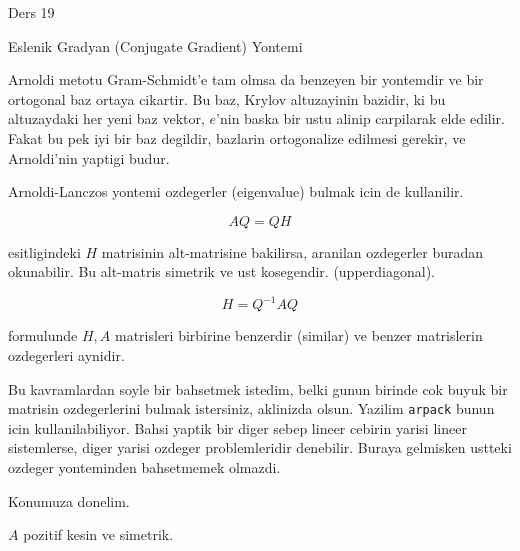 \documentclass[12pt,fleqn]{article}\usepackage{../common}
\begin{document}
Ders 19

Eslenik Gradyan (Conjugate Gradient) Yontemi 

Arnoldi metotu Gram-Schmidt'e tam olmsa da benzeyen bir yontemdir ve bir
ortogonal baz ortaya cikartir. Bu baz, Krylov altuzayinin bazidir, ki bu
altuzaydaki her yeni baz vektor, $e$'nin baska bir ustu alinip carpilarak
elde edilir. Fakat bu pek iyi bir baz degildir, bazlarin ortogonalize
edilmesi gerekir, ve Arnoldi'nin yaptigi budur. 

Arnoldi-Lanczos yontemi ozdegerler (eigenvalue) bulmak icin de kullanilir.

\[ AQ = QH \]

esitligindeki $H$ matrisinin alt-matrisine bakilirsa, aranilan ozdegerler
buradan okunabilir. Bu alt-matris simetrik ve ust kosegendir.
(upperdiagonal). 

\[ H = Q^{-1}AQ \]

formulunde $H,A$ matrisleri birbirine benzerdir (similar) ve benzer
matrislerin ozdegerleri aynidir. 

Bu kavramlardan soyle bir bahsetmek istedim, belki gunun birinde cok buyuk
bir matrisin ozdegerlerini bulmak istersiniz, aklinizda olsun. Yazilim
\verb!arpack! bunun icin kullanilabiliyor. Bahsi yaptik bir diger sebep
lineer cebirin yarisi lineer sistemlerse, diger yarisi ozdeger
problemleridir denebilir. Buraya gelmisken ustteki ozdeger yonteminden
bahsetmemek olmazdi. 

Konumuza donelim. 

$A$ pozitif kesin ve simetrik. 
\end{document}
